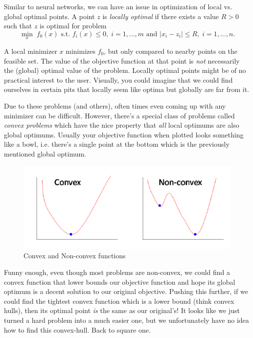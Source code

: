 \documentclass[11 pt]{scrartcl}
\begin{document}
Similar to neural networks, we can have an issue in optimization of local vs. global optimal points. 
A point $z$ is \emph{locally optimal} if there exists a value $R>0$ such that $z$ is optimal for problem 
\[ \min_x\; f_0(x) \text{ s.t. } f_i(x) \leq 0,\;  i=1, \dots, m \text{ and } |x_i - z_i| \leq R,\; i=1, \dots, n.\] 

A local minimizer $x$ minimizes $f_0$, but only compared to nearby points on the feasible set. 
The value of the objective function at that point is \emph{not} necessarily the (global) optimal value of the problem. 
Locally optimal points might be of no practical interest to the user. 
Visually, you could imagine that we could find ourselves in certain pits that locally seem like optima but globally are far from it. 

Due to these problems (and others), often times even coming up with any minimizer can be difficult. 
However, there's a special class of problems called \emph{convex problems} which have the nice property that \emph{all} local optimums are also global optimums.
Usually your objective function when plotted looks something like a bowl, i.e. there's a single point at the bottom which is the previously mentioned global optimum.

\begin{figure}[!htb]
    \centering
    \includegraphics[scale=0.6]{convexnonconvex.png}
    \caption{Convex and Non-convex functions}
\end{figure}

Funny enough, even though most problems are non-convex, we could find a convex function that lower bounds our objective function and hope its global optimum is a decent solution to our original objective. 
Pushing this further, if we could find the tightest convex function which is a lower bound (think convex hulls), then its optimal point \emph{is} the same as our original's! 
It looks like we just turned a hard problem into a much easier one, but we unfortunately have no idea how to find this convex-hull. 
Back to square one. 
\end{document}
